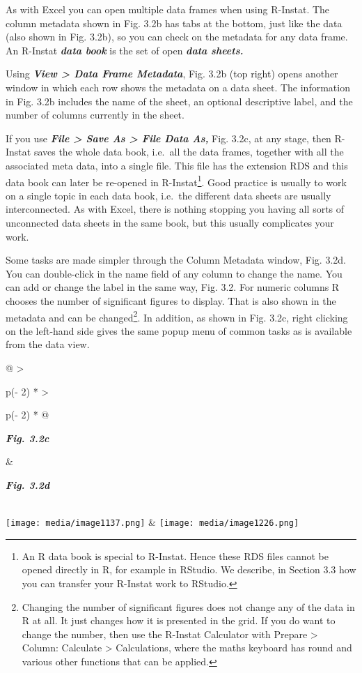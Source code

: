 \documentclass[
  letterpaper,
  DIV=11,
  numbers=noendperiod]{scrreprt}
\begin{document}
As with Excel you can open multiple data frames when using R-Instat. The
column metadata shown in Fig. 3.2b has tabs at the bottom, just like the
data (also shown in Fig. 3.2b), so you can check on the metadata for any
data frame. An R-Instat \textbf{\emph{data book}} is the set of open
\textbf{\emph{data sheets.}}

Using \textbf{\emph{View \textgreater{} Data Frame Metadata}}, Fig. 3.2b
(top right) opens another window in which each row shows the metadata on
a data sheet. The information in Fig. 3.2b includes the name of the
sheet, an optional descriptive label, and the number of columns
currently in the sheet.

If you use \textbf{\emph{File \textgreater{} Save As \textgreater{} File
Data As,}} Fig. 3.2c, at any stage, then R-Instat saves the whole data
book, i.e.~all the data frames, together with all the associated meta
data, into a single file. This file has the extension RDS and this data
book can later be re-opened in R-Instat\footnote{An R data book is
  special to R-Instat. Hence these RDS files cannot be opened directly
  in R, for example in RStudio. We describe, in Section 3.3 how you can
  transfer your R-Instat work to RStudio.}. Good practice is usually to
work on a single topic in each data book, i.e.~the different data sheets
are usually interconnected. As with Excel, there is nothing stopping you
having all sorts of unconnected data sheets in the same book, but this
usually complicates your work.

Some tasks are made simpler through the Column Metadata window, Fig.
3.2d. You can double-click in the name field of any column to change the
name. You can add or change the label in the same way, Fig. 3.2. For
numeric columns R chooses the number of significant figures to display.
That is also shown in the metadata and can be changed\footnote{Changing
  the number of significant figures does not change any of the data in R
  at all. It just changes how it is presented in the grid. If you do
  want to change the number, then use the R-Instat Calculator with
  Prepare \textgreater{} Column: Calculate \textgreater{} Calculations,
  where the maths keyboard has round and various other functions that
  can be applied.}. In addition, as shown in Fig. 3.2c, right clicking
on the left-hand side gives the same popup menu of common tasks as is
available from the data view.

\begin{longtable}[]{@{}
  >{\raggedright\arraybackslash}p{(\columnwidth - 2\tabcolsep) * }
  >{\raggedright\arraybackslash}p{(\columnwidth - 2\tabcolsep) * }@{}}
\toprule\noalign{}
\begin{minipage}[b]{\linewidth}\raggedright
\textbf{\emph{Fig. 3.2c}}
\end{minipage} & \begin{minipage}[b]{\linewidth}\raggedright
\textbf{\emph{Fig. 3.2d}}
\end{minipage} \\
\midrule\noalign{}
\endhead
\bottomrule\noalign{}
\endlastfoot
\texttt{[image: media/image1137.png]}
&
\texttt{[image: media/image1226.png]} \\
\end{longtable}
\end{document}
